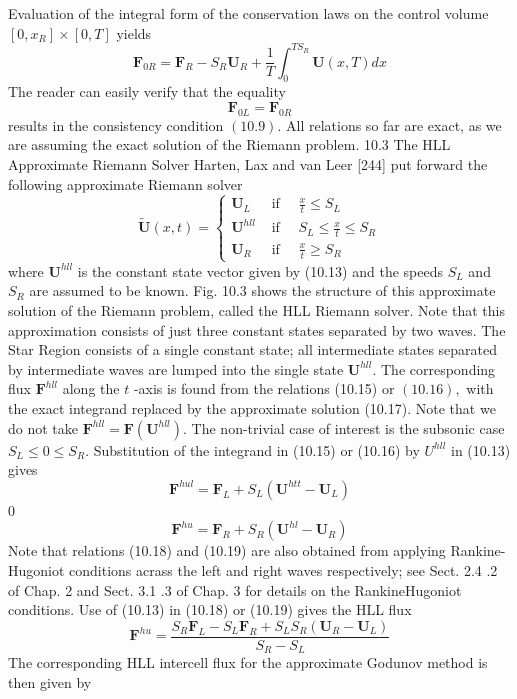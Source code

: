 Evaluation of the integral form of the conservation laws on the control volume $\left[0, x_{R}\right] \times[0, T]$ yields
$$
\mathbf{F}_{0 R}=\mathbf{F}_{R}-S_{R} \mathbf{U}_{R}+\frac{1}{T} \int_{0}^{T S_{R}} \mathbf{U}(x, T) d x
$$
The reader can easily verify that the equality
$$
\mathbf{F}_{0 L}=\mathbf{F}_{0 R}
$$
results in the consistency condition $(10.9) .$ All relations so far are exact, as we are assuming the exact solution of the Riemann problem.
10.3 The HLL Approximate Riemann Solver
Harten, Lax and van Leer [244] put forward the following approximate Riemann solver
$$
\tilde{\mathbf{U}}(x, t)=\left\{\begin{array}{ll}
\mathbf{U}_{L} & \text { if } \quad \frac{x}{t} \leq S_{L} \\
\mathbf{U}^{h l l} & \text { if } \quad S_{L} \leq \frac{x}{t} \leq S_{R} \\
\mathbf{U}_{R} & \text { if } \quad \frac{x}{t} \geq S_{R}
\end{array}\right.
$$
where $\mathbf{U}^{h l l}$ is the constant state vector given by (10.13) and the speeds $S_{L}$ and $S_{R}$ are assumed to be known. Fig. 10.3 shows the structure of this approximate solution of the Riemann problem, called the HLL Riemann solver. Note that this approximation consists of just three constant states separated by two waves. The Star Region consists of a single constant state; all intermediate states separated by intermediate waves are lumped into the single state $\mathbf{U}^{h l l}$. The corresponding flux $\mathbf{F}^{h l l}$ along the $t$ -axis is found from the relations (10.15) or $(10.16),$ with the exact integrand replaced by the approximate solution (10.17). Note that we do not take $\mathbf{F}^{h l l}=\mathbf{F}\left(\mathbf{U}^{h l l}\right) .$ The non-trivial case of interest is the subsonic case $S_{L} \leq 0 \leq S_{R}$. Substitution of the integrand in (10.15) or (10.16) by $U^{h l l}$ in (10.13) gives
$$
\mathbf{F}^{h u l}=\mathbf{F}_{L}+S_{L}\left(\mathbf{U}^{h t t}-\mathbf{U}_{L}\right)
$$
0
$$
\mathbf{F}^{h u}=\mathbf{F}_{R}+S_{R}\left(\mathbf{U}^{h l}-\mathbf{U}_{R}\right)
$$
Note that relations (10.18) and (10.19) are also obtained from applying Rankine-Hugoniot conditions acrass the left and right waves respectively; see Sect. 2.4 .2 of Chap. 2 and Sect. 3.1 .3 of Chap. 3 for details on the RankineHugoniot conditions. Use of (10.13) in (10.18) or (10.19) gives the HLL flux
$$
\mathbf{F}^{h u}=\frac{S_{R} \mathbf{F}_{L}-S_{L} \mathbf{F}_{R}+S_{L} S_{R}\left(\mathbf{U}_{R}-\mathbf{U}_{L}\right)}{S_{R}-S_{L}}
$$
The corresponding HLL intercell flux for the approximate Godunov method is then given by
